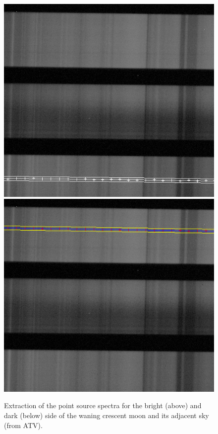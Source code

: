 \begin{figure}[htb]
\begin{center}
\includegraphics[scale=0.33]{plots/trace/earth.png}
\includegraphics[scale=0.33]{plots/trace/earthsky.png}
\caption{Extraction of the point source spectra for the bright (above) and dark
(below) side of the
waning crescent moon and its adjacent sky (from ATV).}
\label{star-cal}
\end{center}
\end{figure}


